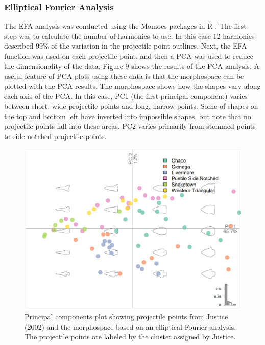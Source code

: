 \documentclass[a4paper]{article}
\begin{document}
\hypertarget{elliptical-fourier-analysis}{%
\subsubsection*{Elliptical Fourier Analysis}\label{elliptical-fourier-analysis}}

The EFA analysis was conducted using the Momocs packages \autocite{Bonhomme2014-gt} in R \autocite{R_Core_Team2022-wb}. The first step was to calculate the number of harmonics to use. In this case 12 harmonics described 99\% of the variation in the projectile point outlines. Next, the EFA function was used on each projectile point, and then a PCA was used to reduce the dimensionality of the data. Figure 9 shows the results of the PCA analysis. A useful feature of PCA plots using these data is that the morphospace can be plotted with the PCA results. The morphospace shows how the shapes vary along each axis of the PCA. In this case, PC1 (the first principal component) varies between short, wide projectile points and long, narrow points. Some of shapes on the top and bottom left have inverted into impossible shapes, but note that no projectile points fall into these areas. PC2 varies primarily from stemmed points to side-notched projectile points.

\begin{figure}
\includegraphics[width=1\linewidth]{figures/JusticeEFAPCA} \caption{Principal components plot showing projectile points from Justice (2002) and the morphospace based on an elliptical Fourier analysis. The projectile points are labeled by the cluster assigned by Justice.}\label{fig:JusticeEFAPCA}
\end{figure}
\end{document}
